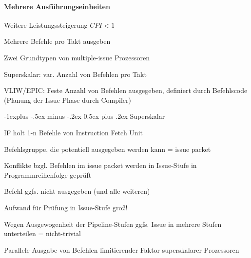 \documentclass[10pt,landscape]{article}
\makeatletter
\renewcommand{\subsection}{\@startsection{subsection}{2}{0mm}%
                                {-1explus -.5ex minus -.2ex}%
                                {0.5ex plus .2ex}%
                                {\normalfont\normalsize\bfseries}}
\makeatother
\begin{document}
\begin{multicols}{3}
  \paragraph{Mehrere Ausführungseinheiten}
  \begin{itemize*}
    \item Weitere Leistungssteigerung $CPI < 1$
    \item Mehrere Befehle pro Takt ausgeben
    \item Zwei Grundtypen von multiple-issue Prozessoren
    \begin{itemize*}
      \item Superskalar: var. Anzahl von Befehlen pro Takt
      \item VLIW/EPIC: Feste Anzahl von Befehlen ausgegeben, definiert durch Befehlscode (Planung der Issue-Phase durch Compiler)
    \end{itemize*}
  \end{itemize*}
  
  \subsection{Superskalar}
  \begin{itemize*}
    \item IF holt 1-n Befehle von Instruction Fetch Unit
    \item Befehlsgruppe, die potentiell ausgegeben werden kann = issue packet
    \item Konflikte bzgl. Befehlen im issue packet werden in Issue-Stufe in Programmreihenfolge geprüft
    \item Befehl ggfs. nicht ausgegeben (und alle weiteren)
    \item Aufwand für Prüfung in Issue-Stufe groß!
    \item Wegen Ausgewogenheit der Pipeline-Stufen ggfs. Issue in mehrere Stufen unterteilen = nicht-trivial
    \item Parallele Ausgabe von Befehlen limitierender Faktor superskalarer Prozessoren
  \end{itemize*}
  

\end{multicols}
\end{document}
